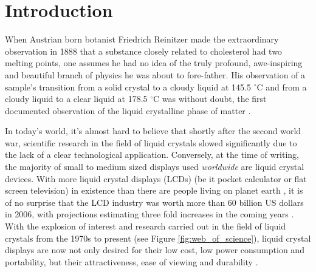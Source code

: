 \chapter{Introduction}

When Austrian born botanist Friedrich Reinitzer made the extraordinary observation in 1888 that a substance closely related to cholesterol had two melting points, one assumes he had no idea of the truly profound, awe-inspiring and beautiful branch of physics he was about to fore-father. His observation of a sample's transition from a solid crystal to a cloudy liquid at 145.5 $^{\circ}$C and from a cloudy liquid to a clear liquid at 178.5 $^{\circ}$C was without doubt, the first documented observation of the liquid crystalline phase of matter \citep{Reinitzer1888, Sluckin2004}.

In today's world, it's almost hard to believe that shortly after the second world war, scientific research in the field of liquid crystals slowed significantly due to the lack of a clear technological application. Conversely, at the time of writing, the majority of small to medium sized displays used \textit{worldwide} are liquid crystal devices. With more liquid crystal displays (LCDs) (be it pocket calculator or flat screen television) in existence than there are people living on planet earth \citep{Bruce2006}, it is of no surprise that the LCD industry was worth more than 60 billion US dollars in 2006, with projections estimating three fold increases in the coming years \citep{Bruce2006}. With the explosion of interest and research carried out in the field of liquid crystals from the 1970s to present (see Figure \ref{fig:web_of_science}), liquid crystal displays are now not only desired for their low cost, low power consumption and portability, but their attractiveness, ease of viewing and durability \citep{Collings1997}.

